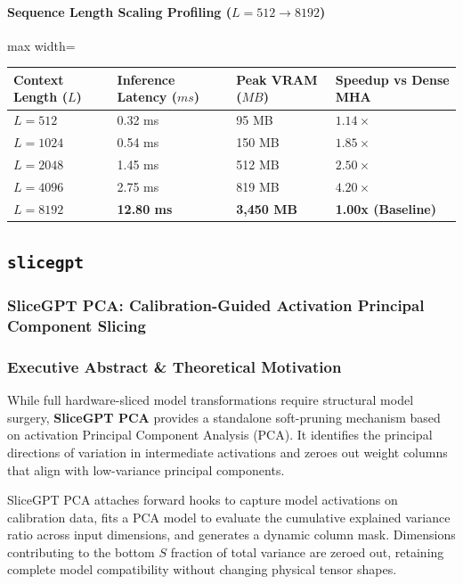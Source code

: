 \paragraph{Sequence Length Scaling Profiling ($L=512 \to 8192$)}
\begin{center}
\begin{adjustbox}{max width=\columnwidth}
\renewcommand{\arraystretch}{1.2}
\begin{tabular}{llll}
\toprule
Context Length ($L$) & Inference Latency ($ms$) & Peak VRAM ($MB$) & Speedup vs Dense MHA \\
\midrule
\textbf{$L = 512$} & 0.32 ms & 95 MB & $1.14\times$ \\
\textbf{$L = 1024$} & 0.54 ms & 150 MB & $1.85\times$ \\
\textbf{$L = 2048$} & 1.45 ms & 512 MB & $2.50\times$ \\
\textbf{$L = 4096$} & 2.75 ms & 819 MB & $4.20\times$ \\
\textbf{$L = 8192$} & \textbf{12.80 ms} & \textbf{3,450 MB} & \textbf{1.00x (Baseline)} \\


\bottomrule
\end{tabular}
\end{adjustbox}
\end{center}

\subsection{\texttt{slicegpt}}
\subsubsection*{SliceGPT PCA: Calibration-Guided Activation Principal Component Slicing}

\subsubsection*{Executive Abstract \& Theoretical Motivation}

While full hardware-sliced model transformations require structural model surgery, \textbf{SliceGPT PCA} provides a standalone soft-pruning mechanism based on activation Principal Component Analysis (PCA). It identifies the principal directions of variation in intermediate activations and zeroes out weight columns that align with low-variance principal components.

SliceGPT PCA attaches forward hooks to capture model activations on calibration data, fits a PCA model to evaluate the cumulative explained variance ratio across input dimensions, and generates a dynamic column mask. Dimensions contributing to the bottom $S$ fraction of total variance are zeroed out, retaining complete model compatibility without changing physical tensor shapes.

